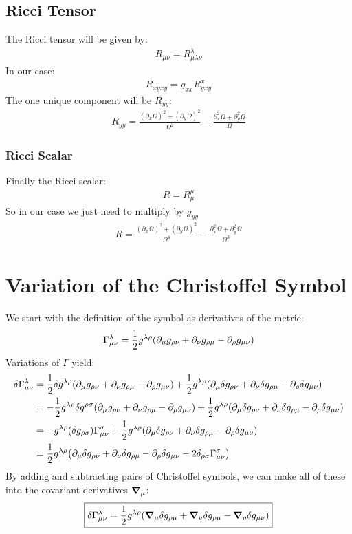 \documentclass[12pt]{article}
\newcommand{\D}{\partial}
\begin{document}
\subsection{Ricci Tensor}
The Ricci tensor will be given by:
\begin{align*}
  R_{\mu\nu}=R^\lambda_{\mu\lambda\nu}
\end{align*}
In our case:
\begin{align*}
  R_{xyxy}=g_{xx}R^x_{yxy}
\end{align*}
The one unique component will be $R_{yy}$:
\begin{align*}
  R_{yy}=\boxed{\frac{(\D_x\Omega)^2+(\D_y\Omega)^2}{\Omega^2}
    -\frac{\D_x^2\Omega+\D_y^2\Omega}{\Omega}}
\end{align*}
\subsubsection{Ricci Scalar}
Finally the Ricci scalar:
\begin{align*}
  R=R^\mu_\mu
\end{align*}
So in our case we just need to multiply by $g_{yy}$
\begin{align*}
  R=\boxed{\frac{(\D_x\Omega)^2+(\D_y\Omega)^2}{\Omega^4}
    -\frac{\D_x^2\Omega+\D_y^2\Omega}{\Omega^3}}
\end{align*}
\section{Variation of the Christoffel Symbol}
We start with the definition of the symbol as derivatives of the metric:
\begin{align*}
  \Gamma^\lambda_{\mu\nu}=\frac{1}{2}g^{\lambda\rho}
  \qty(\D_\mu g_{\rho\nu}+\D_\nu g_{\rho\mu}-\D_\rho g_{\mu\nu})
\end{align*}
Variations of $\Gamma$ yield:
\begin{align*}
  \delta\Gamma^\lambda_{\mu\nu}&=\frac{1}{2}\delta g^{\lambda\rho}
  \qty(\D_\mu g_{\rho\nu}+\D_\nu g_{\rho\mu}-\D_\rho g_{\mu\nu})+
  \frac{1}{2}g^{\lambda\rho} \qty(\D_\mu\delta g_{\rho\nu}+
  \D_\nu\delta g_{\rho\mu}-\D_\rho\delta g_{\mu\nu})\\
  &=-\frac{1}{2}g^{\lambda\rho}\delta g^{\rho\sigma}
  \qty(\D_\mu g_{\rho\nu}+\D_\nu g_{\rho\mu}-\D_\rho g_{\mu\nu})+
  \frac{1}{2}g^{\lambda\rho} \qty(\D_\mu\delta g_{\rho\nu}+
  \D_\nu\delta g_{\rho\mu}-\D_\rho\delta g_{\mu\nu})\\
  &=-g^{\lambda\rho}(\delta g_{\rho\sigma})\Gamma^\sigma_{\mu\nu}
  +\frac{1}{2}g^{\lambda\rho} \qty(\D_\mu\delta g_{\rho\nu}+
  \D_\nu\delta g_{\rho\mu}-\D_\rho\delta g_{\mu\nu})\\
  &=\frac{1}{2}g^{\lambda\rho}\qty(\D_\mu\delta g_{\rho\nu}+
  \D_\nu\delta g_{\rho\mu}-\D_\rho\delta g_{\mu\nu}
  -2\delta_{\rho\sigma}\Gamma^{\sigma}_{\mu\nu})
\end{align*}
By adding and subtracting pairs of Christoffel symbols, we can make all of these into the covariant derivatives $\grad_\mu$:
\begin{align*}
  \boxed{\delta\Gamma^\lambda_{\mu\nu}=\frac{1}{2}g^{\lambda\rho}\qty(
   \grad_\mu\delta g_{\rho\mu}
  +\grad_\nu\delta g_{\rho\mu}
  -\grad_\rho\delta g_{\mu\nu})}
\end{align*}
\end{document}
